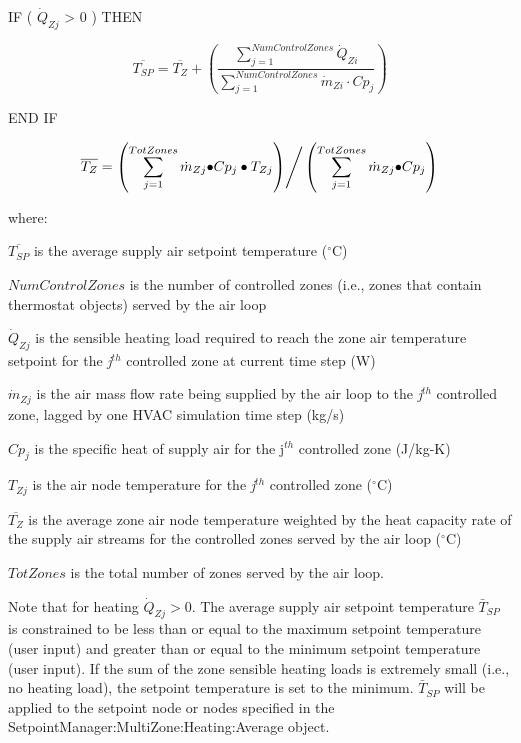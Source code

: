 IF ( \({\dot Q_{Zj}}\) \textgreater{} 0 ) THEN

\begin{equation}
\overline {{T_{SP}}}  = \overline {{T_Z}}  + \left( {\frac{{\sum\limits_{j = 1}^{NumControlZones} {{{\dot Q}_{Zi}}} }}{{\sum\limits_{j = 1}^{NumControlZones} {{{\dot m}_{Zi}}\cdot C{p_j}} }}} \right)
\end{equation}

END IF

\begin{equation}
{\overline{T_Z}} = {{\left( {\sum\limits_{j = 1}^{TotZones} {{{\dot m}_{Zj}} \bullet } C{p_j} \bullet {T_{Zj}}} \right)} \mathord{\left/ {\vphantom {{\left( {\sum\limits_{j = 1}^{TotZones} {{{\dot m}_{Zj}} \bullet } C{p_j} \bullet {T_{Zj}}} \right)} {\left( {\sum\limits_{j = 1}^{TotZones} {{{\dot m}_{Zj}} \bullet } C{p_j}} \right)}}} \right. } {\left( {\sum\limits_{j = 1}^{TotZones} {{{\dot m}_{Zj}} \bullet } C{p_j}} \right)}}
\end{equation}

where:

\({\overline{T_{SP}}}\) is the average supply air setpoint temperature (\(^{\circ}\)C)

\(NumControlZones\) is the number of controlled zones (i.e., zones that contain thermostat objects) served by the air loop

\({\dot Q_{Zj}}\) is the sensible heating load required to reach the zone air temperature setpoint for the \emph{j}\(^{th}\) controlled zone at current time step (W)

\({\dot m_{Zj}}\) is the air mass flow rate being supplied by the air loop to the \emph{j}\(^{th}\) controlled zone, lagged by one HVAC simulation time step (kg/s)

\(C{p_j}\) is the specific heat of supply air for the j\(^{th}\) controlled zone (J/kg-K)

\({T_{Zj}}\) is the air node temperature for the \emph{j}\(^{th}\) controlled zone (\(^{\circ}\)C)

\({\overline{T_Z}}\) is the average zone air node temperature weighted by the heat capacity rate of the supply air streams for the controlled zones served by the air loop (\(^{\circ}\)C)

\(TotZones\) is the total number of zones served by the air loop.

Note that for heating \({\dot Q_{Zj}} > 0\). The average supply air setpoint temperature \({\bar T_{SP}}\) is constrained to be less than or equal to the maximum setpoint temperature (user input) and greater than or equal to the minimum setpoint temperature (user input). If the sum of the zone sensible heating loads is extremely small (i.e., no heating load), the setpoint temperature is set to the minimum. \({\bar T_{SP}}\) will be applied to the setpoint node or nodes specified in the SetpointManager:MultiZone:Heating:Average object.

